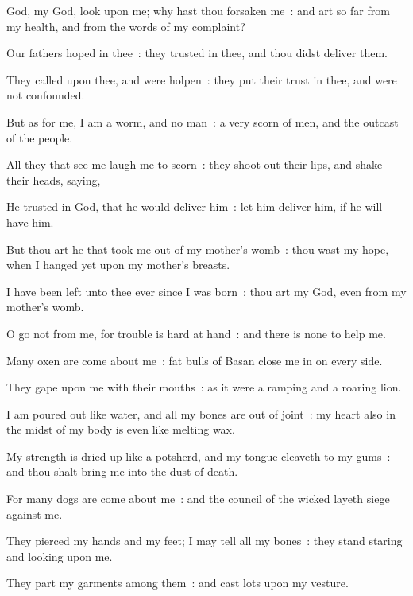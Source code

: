  God, my God, look upon me; why hast thou forsaken me~: and art so far from my health, and from the words of my complaint?\par
{}
Our fathers hoped in thee~: they trusted in thee, and thou didst deliver them.\par
{}They called upon thee, and were holpen~: they put their trust in thee, and were not confounded.\par
{}But as for me, I am a worm, and no man~: a very scorn of men, and the outcast of the people.\par
{}All they that see me laugh me to scorn~: they shoot out their lips, and shake their heads, saying,\par
{}He trusted in God, that he would deliver him~: let him deliver him, if he will have him.\par
{}But thou art he that took me out of my mother's womb~: thou wast my hope, when I hanged yet upon my mother's breasts.\par
{}I have been left unto thee ever since I was born~: thou art my God, even from my mother's womb.\par
{}O go not from me, for trouble is hard at hand~: and there is none to help me.\par
{}Many oxen are come about me~: fat bulls of Basan close me in on every side.\par
{}They gape upon me with their mouths~: as it were a ramping and a roaring lion.\par
{}I am poured out like water, and all my bones are out of joint~: my heart also in the midst of my body is even like melting wax.\par
{}My strength is dried up like a potsherd, and my tongue cleaveth to my gums~: and thou shalt bring me into the dust of death.\par
{}For many dogs are come about me~: and the council of the wicked layeth siege against me.\par
{}They pierced my hands and my feet; I may tell all my bones~: they stand staring and looking upon me.\par
{}They part my garments among them~: and cast lots upon my vesture.\par
